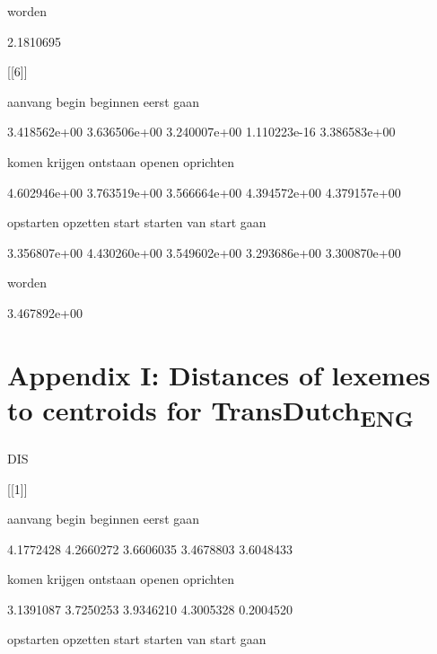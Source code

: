         worden 



     2.1810695 



[[6]]



       aanvang          begin       beginnen          eerst           gaan 



  3.418562e+00   3.636506e+00   3.240007e+00   1.110223e-16   3.386583e+00 



         komen        krijgen       ontstaan         openen      oprichten 



  4.602946e+00   3.763519e+00   3.566664e+00   4.394572e+00   4.379157e+00 



     opstarten       opzetten          start        starten van start gaan 



  3.356807e+00   4.430260e+00   3.549602e+00   3.293686e+00   3.300870e+00 



        worden 



  3.467892e+00 


\section{Appendix I: Distances of lexemes to centroids for TransDutch\textsubscript{ENG}}

DIS



[[1]]



       aanvang          begin       beginnen          eerst           gaan 



     4.1772428      4.2660272      3.6606035      3.4678803      3.6048433 



         komen        krijgen       ontstaan         openen      oprichten 



     3.1391087      3.7250253      3.9346210      4.3005328      0.2004520 



     opstarten       opzetten          start        starten van start gaan 



